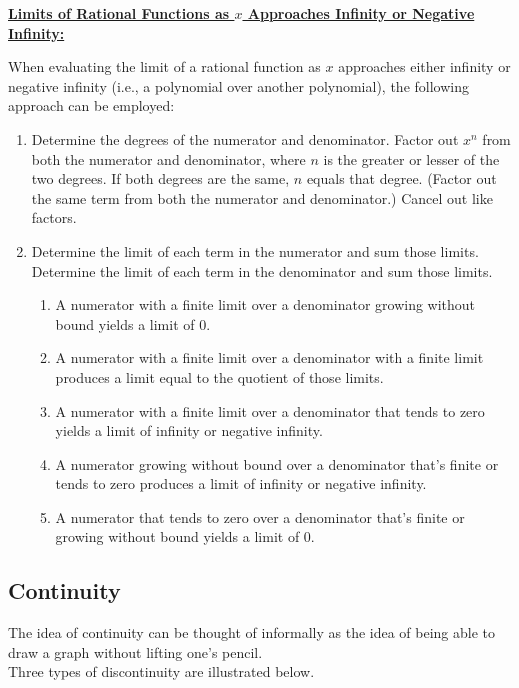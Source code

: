 \documentclass{article}
\begin{document}
\newpage
\textbf{\underline{Limits of Rational Functions as \( x \) Approaches Infinity or Negative Infinity:}}

When evaluating the limit of a rational function as \( x \) approaches either infinity or negative infinity (i.e., a polynomial over another polynomial), the following approach can be employed:

\begin{enumerate}
    \item Determine the degrees of the numerator and denominator. Factor out \( x^n \) from both the numerator and denominator, where \( n \) is the greater or lesser of the two degrees. If both degrees are the same, \( n \) equals that degree. (Factor out the same term from both the numerator and denominator.) Cancel out like factors.
    
    \item Determine the limit of each term in the numerator and sum those limits. Determine the limit of each term in the denominator and sum those limits.
    \begin{enumerate}
        \item A numerator with a finite limit over a denominator growing without bound yields a limit of 0.
        
        \item A numerator with a finite limit over a denominator with a finite limit produces a limit equal to the quotient of those limits.
        
        \item A numerator with a finite limit over a denominator that tends to zero yields a limit of infinity or negative infinity.
        
        \item A numerator growing without bound over a denominator that's finite or tends to zero produces a limit of infinity or negative infinity.
        
        \item A numerator that tends to zero over a denominator that's finite or growing without bound yields a limit of 0.
    \end{enumerate}
\end{enumerate}
\subsection{Continuity}

The idea of continuity can be thought of informally as the idea of being able to draw a graph without lifting one’s pencil.\\
Three types of discontinuity are illustrated below.
\end{document}
